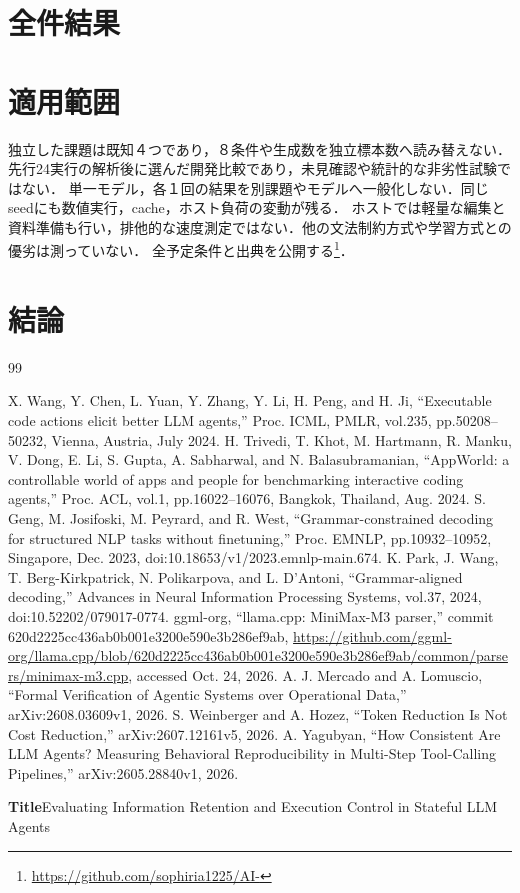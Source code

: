 \documentclass[uplatex,a4paper,twocolumn,10pt]{jsarticle}
\begin{document}
\section{全件結果}




\section{適用範囲}
独立した課題は既知４つであり，８条件や生成数を独立標本数へ読み替えない．
先行24実行の解析後に選んだ開発比較であり，未見確認や統計的な非劣性試験ではない．
単一モデル，各１回の結果を別課題やモデルへ一般化しない．同じseedにも数値実行，cache，ホスト負荷の変動が残る．
ホストでは軽量な編集と資料準備も行い，排他的な速度測定ではない．他の文法制約方式や学習方式との優劣は測っていない．
全予定条件と出典を公開する\footnote{\url{https://github.com/sophiria1225/AI-}}．

\section{結論}

\begin{thebibliography}{99}
\small\raggedright
{} X. Wang, Y. Chen, L. Yuan, Y. Zhang, Y. Li, H. Peng, and H. Ji, ``Executable code actions elicit better LLM agents,'' Proc. ICML, PMLR, vol.235, pp.50208--50232, Vienna, Austria, July 2024.
 H. Trivedi, T. Khot, M. Hartmann, R. Manku, V. Dong, E. Li, S. Gupta, A. Sabharwal, and N. Balasubramanian, ``AppWorld: a controllable world of apps and people for benchmarking interactive coding agents,'' Proc. ACL, vol.1, pp.16022--16076, Bangkok, Thailand, Aug. 2024.
 S. Geng, M. Josifoski, M. Peyrard, and R. West, ``Grammar-constrained decoding for structured NLP tasks without finetuning,'' Proc. EMNLP, pp.10932--10952, Singapore, Dec. 2023, doi:10.18653/v1/2023.emnlp-main.674.
 K. Park, J. Wang, T. Berg-Kirkpatrick, N. Polikarpova, and L. D'Antoni, ``Grammar-aligned decoding,'' Advances in Neural Information Processing Systems, vol.37, 2024, doi:10.52202/079017-0774.
 ggml-org, ``llama.cpp: MiniMax-M3 parser,'' commit 620d2225cc436ab0b001e3200e590e3b286ef9ab, \url{https://github.com/ggml-org/llama.cpp/blob/620d2225cc436ab0b001e3200e590e3b286ef9ab/common/parsers/minimax-m3.cpp}, accessed Oct. 24, 2026.
 A. J. Mercado and A. Lomuscio, ``Formal Verification of Agentic Systems over Operational Data,'' arXiv:2608.03609v1, 2026.
 S. Weinberger and A. Hozez, ``Token Reduction Is Not Cost Reduction,'' arXiv:2607.12161v5, 2026.
 A. Yagubyan, ``How Consistent Are LLM Agents? Measuring Behavioral Reproducibility in Multi-Step Tool-Calling Pipelines,'' arXiv:2605.28840v1, 2026.
\end{thebibliography}
\clearpage
\onecolumn
\noindent\textbf{Title}\quad Evaluating Information Retention and Execution Control in Stateful LLM Agents
\end{document}
